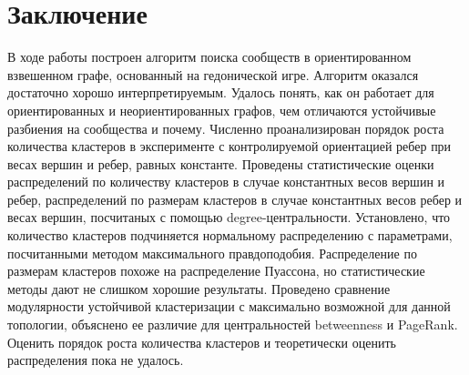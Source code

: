 \chapter{Заключение}

В ходе работы построен алгоритм поиска сообществ в ориентированном взвешенном графе, основанный на гедонической игре. Алгоритм оказался достаточно хорошо интерпретируемым. Удалось понять, как он работает для ориентированных и неориентированных графов, чем отличаются устойчивые разбиения на сообщества и почему. Численно проанализирован порядок роста количества кластеров в эксперименте с контролируемой ориентацией ребер при весах вершин и ребер, равных константе. Проведены статистические оценки распределений по количеству кластеров в случае константных весов вершин и ребер, распределений по размерам кластеров в случае константных весов ребер и весах вершин, посчитаных с помощью degree-центральности. Установлено, что количество кластеров подчиняется нормальному распределению с параметрами, посчитанными методом максимального правдоподобия. Распределение по размерам кластеров похоже на распределение Пуассона, но статистические методы дают не слишком хорошие результаты. Проведено сравнение модулярности устойчивой кластеризации с максимально возможной для данной топологии, объяснено ее различие для центральностей betweenness и PageRank. Оценить порядок роста количества кластеров и теоретически оценить распределения пока не удалось. 